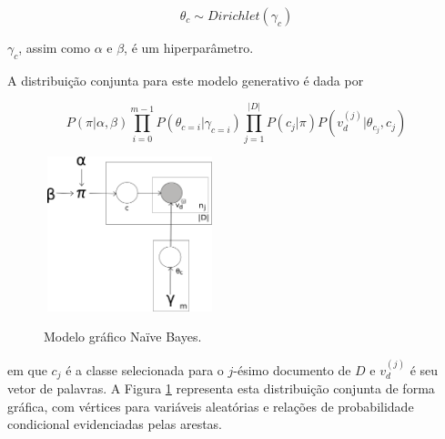 \begin{equation}
\label{eq6:theta-naive}
\ensuremath{\theta_c \sim Dirichlet(\gamma_c)}
\end{equation}

\ensuremath{\gamma_c}, assim como \ensuremath{\alpha} e \ensuremath{\beta}, é um hiperparâmetro.

A distribuição conjunta para este modelo generativo é dada por

\begin{equation}
\label{eq7:joint-naive}
\ensuremath{P(\pi | \alpha, \beta)\prod_{i = 0}^{m - 1}P(\theta_{c = i} | \gamma_{c=i})\prod_{j = 1}^{|D|}P(c_j | \pi)P(v_d^{(j)} | \theta_{c_j}, c_j)}
\end{equation}

\begin{figure}[t]
  \centering %
  \includegraphics[width=5cm, height=4.5cm]{naive-joint.png}\\
  \caption{Modelo gráfico Naïve Bayes.}
  \label{naive:joint}
\end{figure}


em que \ensuremath{c_j} é a classe selecionada para o \ensuremath{j}-ésimo documento de \ensuremath{D} e \ensuremath{v_d^{(j)}} é seu vetor de palavras. A Figura \ref{naive:joint} representa esta distribuição conjunta de forma gráfica, com vértices para variáveis aleatórias e relações de probabilidade condicional evidenciadas pelas arestas.



